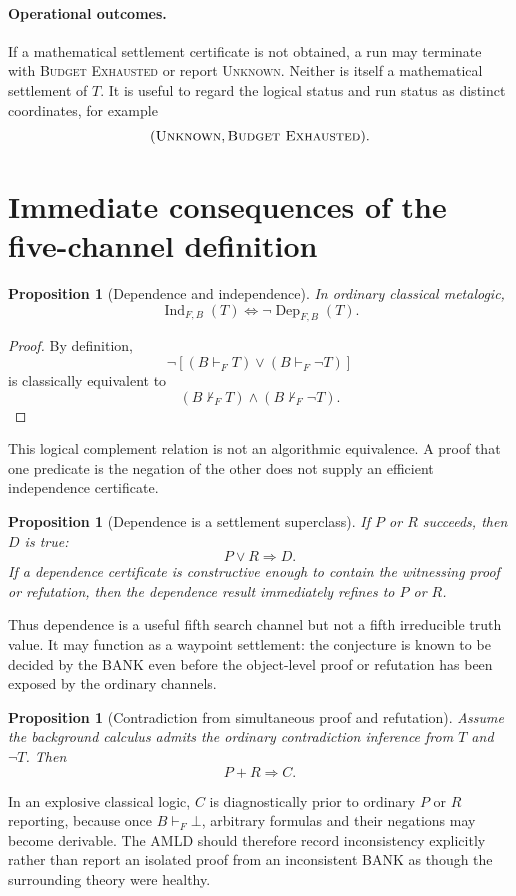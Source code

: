 \documentclass[11pt]{article}
\newtheorem{proposition}[definition]{Proposition}
\theoremstyle{remark}
\newcommand{\Ind}{\operatorname{Ind}}
\newcommand{\Dep}{\operatorname{Dep}}
\begin{document}
\paragraph{Operational outcomes.} If a mathematical settlement certificate is not obtained, a run may terminate with \textsc{Budget Exhausted} or report \textsc{Unknown}. Neither is itself a mathematical settlement of $T$. It is useful to regard the logical status and run status as distinct coordinates, for example
\[
(\textsc{Unknown},\textsc{Budget Exhausted}).
\]

\section{Immediate consequences of the five-channel definition}
\begin{proposition}[Dependence and independence]
In ordinary classical metalogic,
\[
\Ind_{F,B}(T)\Longleftrightarrow\neg\Dep_{F,B}(T).
\]
\end{proposition}
\begin{proof}
By definition,
\[
\neg[(B\vdash_FT)\lor(B\vdash_F\neg T)]
\]
is classically equivalent to
\[
(B\nvdash_FT)\land(B\nvdash_F\neg T).
\]
\end{proof}
This logical complement relation is not an algorithmic equivalence. A proof that one predicate is the negation of the other does not supply an efficient independence certificate.

\begin{proposition}[Dependence is a settlement superclass]
If $P$ or $R$ succeeds, then $D$ is true:
\[
P\lor R\Longrightarrow D.
\]
If a dependence certificate is constructive enough to contain the witnessing proof or refutation, then the dependence result immediately refines to $P$ or $R$.
\end{proposition}
Thus dependence is a useful fifth search channel but not a fifth irreducible truth value. It may function as a waypoint settlement: the conjecture is known to be decided by the BANK even before the object-level proof or refutation has been exposed by the ordinary channels.

\begin{proposition}[Contradiction from simultaneous proof and refutation]
Assume the background calculus admits the ordinary contradiction inference from $T$ and $\neg T$. Then
\[
P+R\Longrightarrow C.
\]
\end{proposition}
In an explosive classical logic, $C$ is diagnostically prior to ordinary $P$ or $R$ reporting, because once $B\vdash_F\bot$, arbitrary formulas and their negations may become derivable. The AMLD should therefore record inconsistency explicitly rather than report an isolated proof from an inconsistent BANK as though the surrounding theory were healthy.
\end{document}
